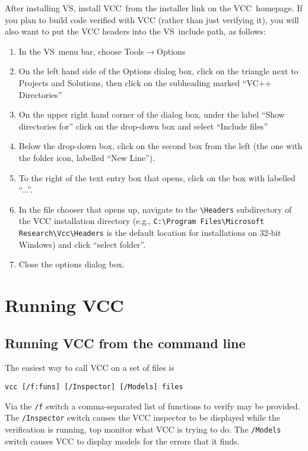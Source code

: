 After installing VS, install VCC\ from the installer link on the
VCC\ homepage. If you plan to build code verified with VCC (rather
than just verifying it), you will also want to put the VCC headers
into the VS\ include path, as follows:
\begin{enumerate}
\item In the VS\ menu bar, choose Tools$\rightarrow$Options
\item On the left hand side of the Options dialog box, click on the
  triangle next to Projects and Solutions, then click on the
  subheading marked ``VC++ Directories''
\item On the upper right hand corner of the dialog box, under the
  label ``Show directories for'' click on the drop-down box and select
  ``Include files''
\item Below the drop-down box, click on the second box from the left
  (the one with the folder icon, labelled ``New Line'').
\item To the right of the text entry box that opens, click on the box
  with labelled ``...''.
\item In the file chooser that opens up, navigate to the \verb!\Headers!
  subdirectory of the VCC installation directory (e.g., \verb!C:\Program Files\Microsoft Research\Vcc\Headers! is the default location for
  installations on 32-bit Windows) and click ``select folder''.
\item Close the options dialog box.
\end{enumerate}

\section{Running VCC}
\subsection{Running VCC from the command line}
The easiest way to call VCC on a set of files is
\begin{verbatim}
vcc [/f:funs] [/Inspector] [/Models] files
\end{verbatim}
Via the \verb!/f! switch a comma-separated list of functions to
verify may be provided. The \verb!/Inspector! switch causes the VCC inspector to be
displayed while the verification is running, top monitor what VCC is
trying to do. The \verb!/Models! switch causes VCC to display models for
the errors that it finds.
 

